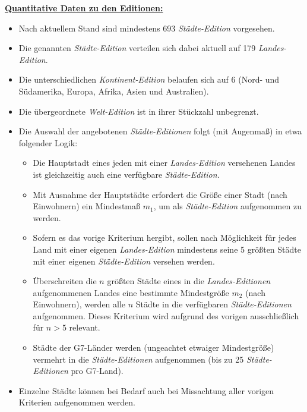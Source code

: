 \vspace{0.4cm}

\underline{\textbf{Quantitative Daten zu den Editionen:}}

\begin{itemize}
    \item Nach aktuellem Stand sind mindestens 693 \textit{Städte-Edition} vorgesehen.
    \item Die genannten \textit{Städte-Edition} verteilen sich dabei aktuell auf 179 \textit{Landes-Edition}.
    \item Die unterschiedlichen \textit{Kontinent-Edition} belaufen sich auf 6 (Nord- und Südamerika, Europa, Afrika, Asien und Australien).
    \item Die übergeordnete \textit{Welt-Edition} ist in ihrer Stückzahl unbegrenzt. 
    \item Die Auswahl der angebotenen \textit{Städte-Editionen} folgt (mit Augenmaß) in etwa folgender Logik:
    \begin{itemize}
    	\item Die Hauptstadt eines jeden mit einer \textit{Landes-Edition} versehenen Landes ist gleichzeitig auch eine verfügbare \textit{Städte-Edition}.
    	\item Mit Ausnahme der Hauptstädte erfordert die Größe einer Stadt (nach Einwohnern) ein Mindestmaß $m_1$, um als \textit{Städte-Edition} aufgenommen zu werden.
    	\item Sofern es das vorige Kriterium hergibt, sollen nach Möglichkeit für jedes Land mit einer eigenen \textit{Landes-Edition} mindestens seine 5 größten Städte mit einer eigenen \textit{Städte-Edition} versehen werden.
    	\item Überschreiten die $n$ größten Städte eines in die \textit{Landes-Editionen} aufgenommenen Landes eine bestimmte Mindestgröße $m_2$ (nach Einwohnern), werden alle $n$ Städte in die verfügbaren \textit{Städte-Editionen} aufgenommen. Dieses Kriterium wird aufgrund des vorigen ausschließlich für $n > 5$ relevant.
    	\item Städte der G7-Länder werden (ungeachtet etwaiger Mindestgröße) vermehrt in die \textit{Städte-Editionen} aufgenommen (bis zu 25 \textit{Städte-Editionen} pro G7-Land).
    \end{itemize} 
    \item Einzelne Städte können bei Bedarf auch bei Missachtung aller vorigen Kriterien aufgenommen werden.
\end{itemize}

\vspace{0.5cm}




